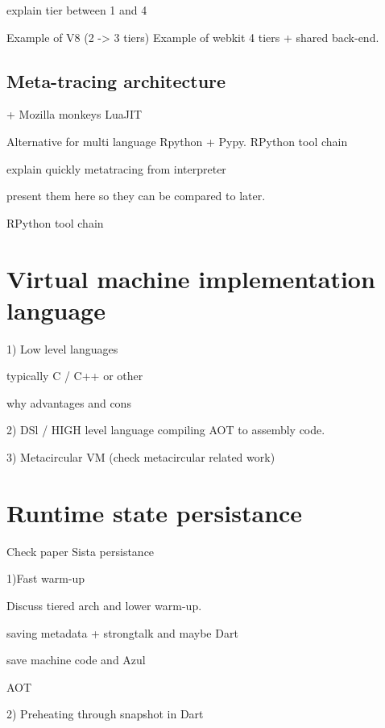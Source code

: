 \documentclass[a4paper,12pt,twoside]{../includes/ThesisStyle}
\begin{document}
explain tier between 1 and 4

Example of V8 (2 -> 3 tiers)
Example of webkit 4 tiers + shared back-end.

\subsection{Meta-tracing architecture}

+ Mozilla monkeys
LuaJIT

Alternative for multi language
Rpython + Pypy.
RPython tool chain \cite{Rigo06a}

explain quickly metatracing from interpreter

present them here so they can be compared to later.

RPython tool chain \cite{Rigo06a}


\section{Virtual machine implementation language}

1) Low level languages

typically C / C++ or other

why advantages and cons

2) DSl / HIGH level language compiling AOT to assembly code.


3) Metacircular VM (check metacircular related work)


\section{Runtime state persistance}

Check paper Sista persistance

1)Fast warm-up

Discuss tiered arch and lower warm-up.

saving metadata + strongtalk and maybe Dart

save machine code and Azul

AOT

2) Preheating through snapshot in Dart
\end{document}
